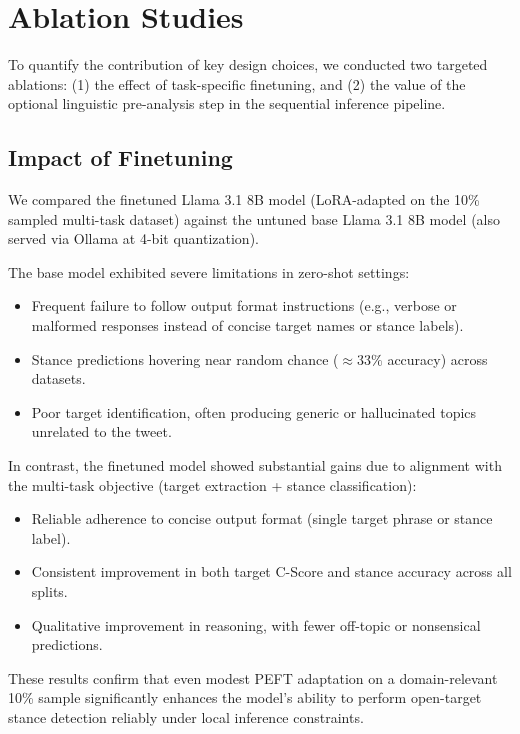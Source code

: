 \documentclass[conference]{IEEEtran}
\begin{document}
\section{Ablation Studies}

To quantify the contribution of key design choices, we conducted two targeted ablations: (1) the effect of task-specific finetuning, and (2) the value of the optional linguistic pre-analysis step in the sequential inference pipeline.

\subsection{Impact of Finetuning}

We compared the finetuned Llama 3.1 8B model (LoRA-adapted on the 10\% sampled multi-task dataset) against the untuned base Llama 3.1 8B model (also served via Ollama at 4-bit quantization).

The base model exhibited severe limitations in zero-shot settings:
\begin{itemize}
    \item Frequent failure to follow output format instructions (e.g., verbose or malformed responses instead of concise target names or stance labels).
    \item Stance predictions hovering near random chance ($\approx 33\%$ accuracy) across datasets.
    \item Poor target identification, often producing generic or hallucinated topics unrelated to the tweet.
\end{itemize}

In contrast, the finetuned model showed substantial gains due to alignment with the multi-task objective (target extraction + stance classification):
\begin{itemize}
    \item Reliable adherence to concise output format (single target phrase or stance label).
    \item Consistent improvement in both target C-Score and stance accuracy across all splits.
    \item Qualitative improvement in reasoning, with fewer off-topic or nonsensical predictions.
\end{itemize}

These results confirm that even modest PEFT adaptation on a domain-relevant 10\% sample significantly enhances the model's ability to perform open-target stance detection reliably under local inference constraints.
\end{document}
